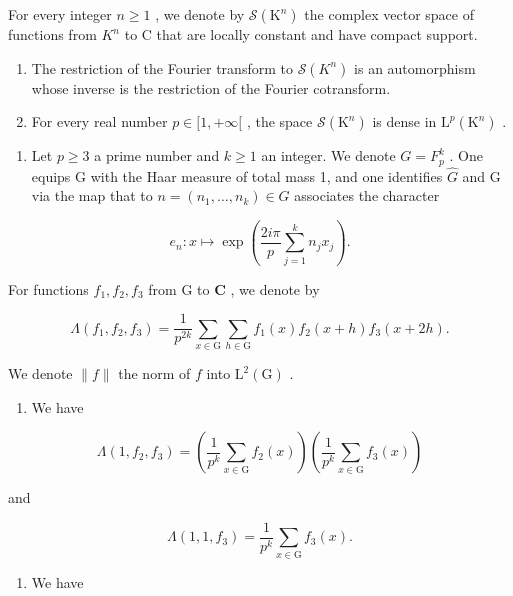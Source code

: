 For every integer \(n \geqslant 1\) , we denote by \(\mathcal{S}(\mathrm{K}^{n})\) the complex vector space of functions from \(K^{n}\) to C that are locally constant and have compact support.

\begin{enumerate}
\def\labelenumi{\alph{enumi})}
\setcounter{enumi}{1}
\item
  The restriction of the Fourier transform to \(\mathcal{S}(K^{n})\) is an automorphism whose inverse is the restriction of the Fourier cotransform.
\item
  For every real number \(p \in [1, +\infty[\) , the space \(\mathcal{S}(\mathrm{K}^n)\) is dense in \(\mathrm{L}^p (\mathrm{K}^n)\) .
\end{enumerate}

\begin{enumerate}
\def\labelenumi{\arabic{enumi})}
\setcounter{enumi}{22}
\tightlist
\item
  Let \(p \geqslant 3\) a prime number and \(k \geqslant 1\) an integer. We denote \(G = F_{p}^{k}\) . One equips G with the Haar measure of total mass 1, and one identifies \(\widehat{G}\) and G via the map that to \(n = (n_{1}, \ldots, n_{k}) \in G\) associates the character
\end{enumerate}

\[
e _ {n} \colon x \mapsto \exp \left(\frac {2 i \pi}{p} \sum_ {j = 1} ^ {k} n _ {j} x _ {j}\right).
\]

For functions \(f_{1}, f_{2}, f_{3}\) from G to \(\mathbf{C}\) , we denote by

\[
\Lambda (f _ {1}, f _ {2}, f _ {3}) = \frac {1}{p ^ {2 k}} \sum_ {x \in \mathrm{G}} \sum_ {h \in \mathrm{G}} f _ {1} (x) f _ {2} (x + h) f _ {3} (x + 2 h).
\]

We denote \(\| f\|\) the norm of \(f\) into \(\mathrm{L}^2 (\mathrm{G})\) .

\begin{enumerate}
\def\labelenumi{\alph{enumi})}
\tightlist
\item
  We have
\end{enumerate}

\[
\Lambda (1, f _ {2}, f _ {3}) = \left(\frac {1}{p ^ {k}} \sum_ {x \in \mathrm{G}} f _ {2} (x)\right) \left(\frac {1}{p ^ {k}} \sum_ {x \in \mathrm{G}} f _ {3} (x)\right)
\]

and

\[
\Lambda (1, 1, f _ {3}) = \frac {1}{p ^ {k}} \sum_ {x \in \mathrm{G}} f _ {3} (x).
\]

\begin{enumerate}
\def\labelenumi{\alph{enumi})}
\setcounter{enumi}{1}
\tightlist
\item
  We have
\end{enumerate}

